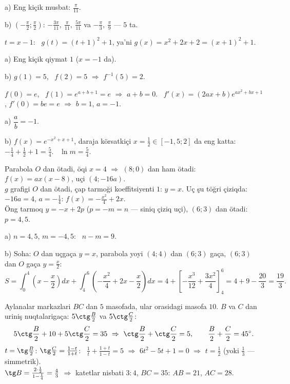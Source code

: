 a) Eng kiçik musbat: $\frac\pi{11}$.

b) $\left(-\frac\pi2;\frac\pi2\right)$: $-\frac{3\pi}{11},\ \frac\pi{11},\ \frac{5\pi}{11}$ va $-\frac\pi3,\ \frac\pi9$ — $5$ ta.

\newpage
{}
$t=x-1$: \ $g(t)=(t+1)^2+1$, ya'ni $g(x)=x^2+2x+2=(x+1)^2+1$.

a) Eng kiçik qiymat $1$ ($x=-1$ da).

b) $g(1)=5$, \ $f(2)=5$ $\Rightarrow$ $f^{-1}(5)=2$.

\newpage
{}
$f(0)=e$, \ $f(1)=e^{a+b+1}=e$ $\Rightarrow$ $a+b=0$. \ $f'(x)=(2ax+b)e^{ax^2+bx+1}$, $f'(0)=be=e$ $\Rightarrow$ $b=1$, $a=-1$.

a) $\dfrac ab=-1$.

b) $f(x)=e^{-x^2+x+1}$, daraja körsatkiçi $x=\frac12\in[-1{,}5;2]$ da eng katta: $-\frac14+\frac12+1=\frac54$. \ $\ln m=\frac54$.

\newpage
{}
Parabola $O$ dan ötadi, öqi $x=4$ $\Rightarrow$ $(8;0)$ dan ham ötadi: $f(x)=ax(x-8)$, uçi $(4;-16a)$.\\
$g$ grafigi $O$ dan ötadi, çap tarmoği koeffitsiyenti $1$: $y=x$. Uç şu töğri çiziqda: $-16a=4$, $a=-\frac14$: $f(x)=-\frac{x^2}4+2x$.\\
Öng tarmoq $y=-x+2p$ ($p=-m=n$ — siniq çiziq uçi), $(6;3)$ dan ötadi: $p=4{,}5$.

a) $n=4{,}5$, $m=-4{,}5$: \ $n-m=9$.

b) Soha: $O$ dan uçgaça $y=x$, parabola yoyi $(4;4)$ dan $(6;3)$ gaça, $(6;3)$ dan $O$ gaça $y=\frac x2$:
\[S=\int_0^4\left(x-\frac x2\right)dx+\int_4^6\left(-\frac{x^2}4+2x-\frac x2\right)dx=4+\left[-\frac{x^3}{12}+\frac{3x^2}4\right]_4^6=4+9-\frac{20}3=\frac{19}3.\]

\newpage
{}
Aylanalar markazlari $BC$ dan $5$ masofada, ular orasidagi masofa $10$. $B$ va $C$ dan uriniş nuqtalarigaça: $5\ctg\frac B2$ va $5\ctg\frac C2$:
\[5\ctg\frac B2+10+5\ctg\frac C2=35\ \Rightarrow\ \ctg\frac B2+\ctg\frac C2=5,\qquad \frac B2+\frac C2=45^\circ.\]
$t=\tg\frac B2$: $\tg\frac C2=\frac{1-t}{1+t}$: \ $\frac1t+\frac{1+t}{1-t}=5$ $\Rightarrow$ $6t^2-5t+1=0$ $\Rightarrow$ $t=\frac12$ (yoki $\frac13$ — simmetrik).\\
$\tg B=\frac{2\cdot\frac12}{1-\frac14}=\frac43$ $\Rightarrow$ katetlar nisbati $3:4$, $BC=35$: $AB=21$, $AC=28$.

